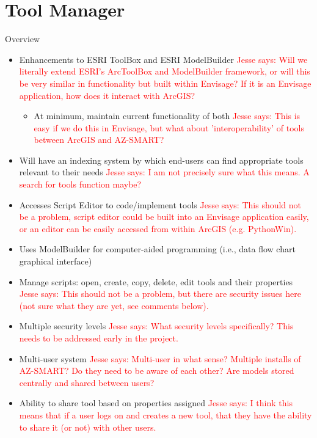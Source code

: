 \documentclass[titlepage]{article}
\begin{document}
\section{Tool Manager}
Overview
\begin{itemize}
	\item Enhancements to ESRI ToolBox and ESRI ModelBuilder
		\textcolor{red}{Jesse says: Will we literally extend ESRI's ArcToolBox and ModelBuilder framework, or will this be very similar in functionality but built within Envisage?  If it is an Envisage application, how does it interact with ArcGIS?}
		\begin{itemize}
			\item At minimum, maintain current functionality of both
				\textcolor{red}{Jesse says: This is easy if we do this in Envisage, but what about 'interoperability' of tools between ArcGIS and AZ-SMART?}
		\end{itemize}
	\item Will have an indexing system by which end-users can find appropriate tools relevant to their needs
		\textcolor{red}{Jesse says: I am not precisely sure what this means. A search for tools function maybe?}
	\item Accesses Script Editor to code/implement tools
		\textcolor{red}{Jesse says: This should not be a problem, script editor could be built into an Envisage application easily, or an editor can be easily accessed from within ArcGIS (e.g. PythonWin).}
	\item Uses ModelBuilder for computer-aided programming (i.e., data flow chart graphical interface)
	\item Manage scripts: open, create, copy, delete, edit tools and their properties
		\textcolor{red}{Jesse says: This should not be a problem, but there are security issues here (not sure what they are yet, see comments below).}
	\item Multiple security levels
		\textcolor{red}{Jesse says: What security levels specifically?  This needs to be addressed early in the project.}
	\item Multi-user system
		\textcolor{red}{Jesse says: Multi-user in what sense?  Multiple installs of AZ-SMART?  Do they need to be aware of each other?  Are models stored centrally and shared between users?}
	\item Ability to share tool based on properties assigned
		\textcolor{red}{Jesse says: I think this means that if a user logs on and creates a new tool, that they have the ability to share it (or not) with other users.}

\end{itemize}
\end{document}
